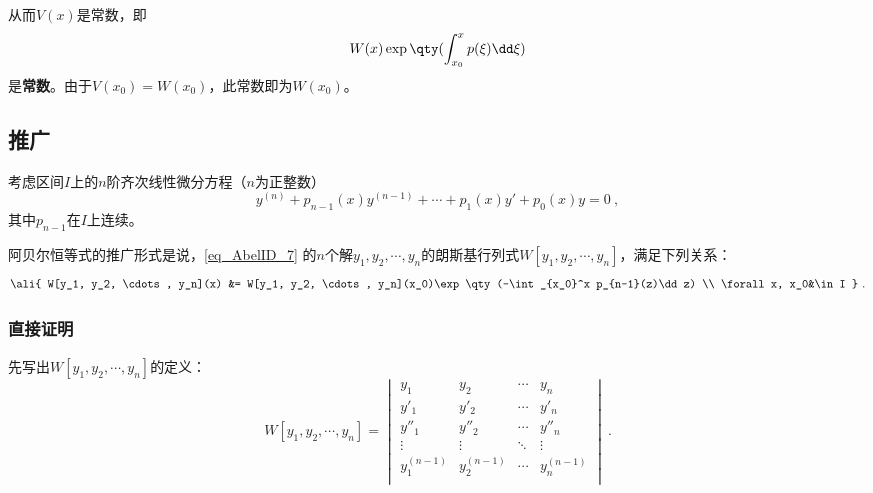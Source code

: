 从而$V(x)$是常数，即
\begin{equation}
W(x)\exp\qty(\int_{x_0}^x p(\xi)\dd \xi)
\end{equation}
是\textbf{常数}。由于$V(x_0)=W(x_0)$，此常数即为$W(x_0)$。


\subsection{推广}

考虑区间$I$上的$n$阶齐次线性微分方程（$n$为正整数）
\begin{equation}\label{eq_AbelID_7}
y^{(n)} + p_{n-1}(x)y^{(n-1)} + \cdots + p_1(x)y' + p_0(x)y = 0~,
\end{equation}
其中$p_{n-1}$在$I$上连续。

阿贝尔恒等式的推广形式是说，\autoref{eq_AbelID_7} 的$n$个解$y_1, y_2, \cdots, y_n$的朗斯基行列式$W[y_1, y_2, \cdots, y_n]$，满足下列关系：
\begin{equation}
\ali{
W[y_1, y_2, \cdots, y_n](x) &= W[y_1, y_2, \cdots, y_n](x_0)\exp\qty(-\int_{x_0}^x p_{n-1}(z)\dd z) \\
\forall x, x_0&\in I
}~.
\end{equation}




\subsubsection{直接证明}

先写出$W[y_1, y_2, \cdots, y_n]$的定义：
\begin{equation}
W[y_1, y_2, \cdots, y_n] = 
\begin{vmatrix}
y_1&y_2&\cdots&y_n\\
y'_1&y'_2&\cdots&y'_n\\
y''_1&y''_2&\cdots&y''_n\\
\vdots&\vdots&\ddots&\vdots\\
y_1^{(n-1)}&y_2^{(n-1)}&\cdots&y_n^{(n-1)}\\
\end{vmatrix}~.
\end{equation}

